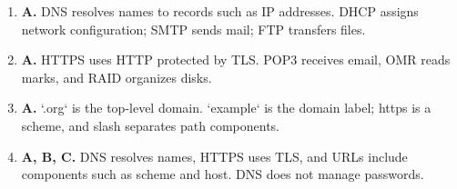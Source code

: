 \begin{enumerate}[label=\textbf{Q\arabic*.}, leftmargin=*]
\item \textbf{A.} DNS resolves names to records such as IP addresses. DHCP assigns network configuration; SMTP sends mail; FTP transfers files.

\item \textbf{A.} HTTPS uses HTTP protected by TLS. POP3 receives email, OMR reads marks, and RAID organizes disks.

\item \textbf{A.} `.org` is the top-level domain. `example` is the domain label; https is a scheme, and slash separates path components.

\item \textbf{A, B, C.} DNS resolves names, HTTPS uses TLS, and URLs include components such as scheme and host. DNS does not manage passwords.

\end{enumerate}
